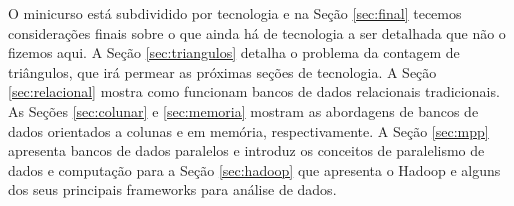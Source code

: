 O minicurso está subdividido por tecnologia e na Seção \ref{sec:final} tecemos considerações finais
sobre o que ainda há de tecnologia a ser detalhada que não o fizemos aqui. A Seção \ref{sec:triangulos}
detalha o problema da contagem de triângulos, que irá permear as próximas seções de tecnologia. A Seção 
\ref{sec:relacional} mostra como funcionam bancos de dados relacionais tradicionais. As Seções 
\ref{sec:colunar} e \ref{sec:memoria} mostram as abordagens de bancos de dados orientados a colunas e 
em memória, respectivamente. A Seção \ref{sec:mpp} apresenta bancos de dados paralelos e introduz os 
conceitos de paralelismo de dados e computação para a Seção \ref{sec:hadoop} que apresenta o Hadoop e
alguns dos seus principais frameworks para análise de dados.

